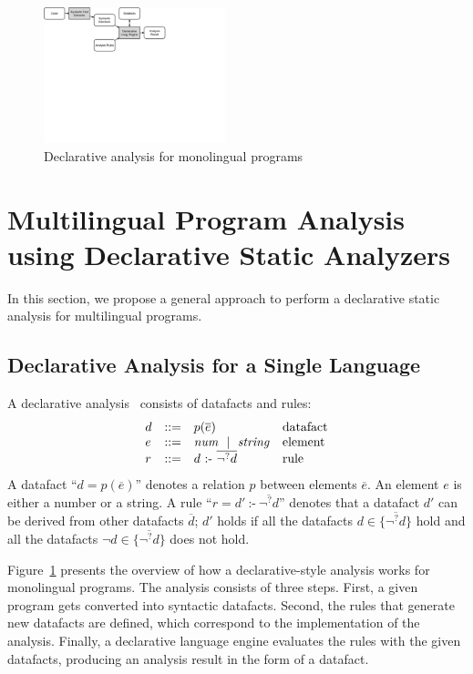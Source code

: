 \begin{figure}[t]
  \centering
  \vspace{2mm}
  \includegraphics[width=0.47\textwidth]{img/overview.pdf}
  \caption{Declarative analysis for monolingual programs}
  \label{fig:overview}
\end{figure}

\section{Multilingual Program Analysis using Declarative Static Analyzers}
\label{sec:approach}

In this section, we propose a general approach to perform a declarative
static analysis for multilingual programs.

\subsection{Declarative Analysis for a Single Language}

A declarative analysis~\cite{doop} consists of datafacts and rules:
\[
  \begin{array}{llll}
d & ::= & p(\overline{e}) & \mbox{datafact}\\
e & ::= & \mbox{\textit{num}}~\mid~\mbox{\textit{string}} & \mbox{element}\\
r & ::= & d\ \mbox{:-}\ \overline{\neg^? d} & \mbox{rule}
\end{array}
\]
A datafact ``$d = p(\overline{e})$'' denotes a relation $p$ between elements $\overline{e}$.
An element $e$ is either a number or a string.
A rule ``$r = d'\ \mbox{:-}\ \overline{\neg^? d}$'' denotes that
a datafact $d'$ can be derived from other datafacts $\overline{d}$;
$d'$ holds if all the datafacts $d \in \{\overline{\neg^? d}\}$ hold
and all the datafacts $\neg d \in \{\overline{\neg^? d}\}$ does not hold.

Figure~\ref{fig:overview} presents the overview of how a
declarative-style analysis works for monolingual programs.
The analysis consists of three steps.
First, a given program gets converted into syntactic datafacts.
Second, the rules that generate new datafacts are defined, which
correspond to the implementation of the analysis.
Finally, a declarative language engine evaluates the rules with the given datafacts,
producing an analysis result in the form of a datafact.

